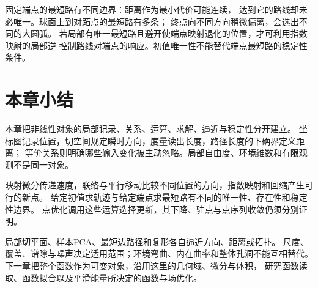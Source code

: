 固定端点的最短路有不同边界：距离作为最小代价可能连续，
达到它的路线却未必唯一。球面上到对跖点的最短路有多条；
终点向不同方向稍微偏离，会选出不同的大圆弧。
若局部有唯一最短路且避开使端点映射退化的位置，才可利用指数映射的局部逆
控制路线对端点的响应。初值唯一性不能替代端点最短路的稳定性条件。

\section{本章小结}
\label{sec:geometry-summary}

本章把非线性对象的局部记录、关系、运算、求解、逼近与稳定性分开建立。
坐标图记录位置，切空间规定瞬时方向，度量读出长度，路径长度的下确界定义距离；
等价关系则明确哪些输入变化被主动忽略。局部自由度、环境维数和有限观测不是同一对象。

映射微分传递速度，联络与平行移动比较不同位置的方向，指数映射和回缩产生可行的新点。
给定初值求轨迹与给定端点求最短路有不同的唯一性、存在性和稳定性边界。
点优化调用这些运算选择更新，其下降、驻点与点序列收敛仍须分别证明。

局部切平面、样本PCA、最短边路径和复形各自逼近方向、距离或拓扑。
尺度、覆盖、谱隙与噪声决定适用范围；环境弯曲、内在曲率和整体孔洞不能互相替代。
下一章把整个函数作为可变对象，沿用这里的几何域、微分与体积，
研究函数读取、函数拟合以及平滑能量所决定的函数与场优化。
